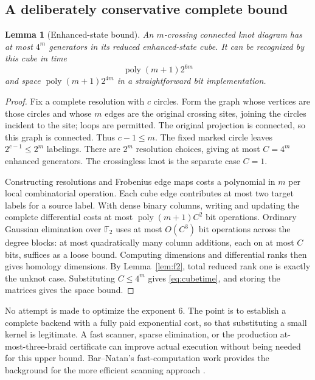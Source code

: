 \documentclass[11pt,letterpaper]{article}
\newtheorem{lemma}[theorem]{Lemma}
\theoremstyle{definition}
\newcommand{\F}{\mathbb F_2}
\newcommand{\poly}{\operatorname{poly}}
\begin{document}
\subsection{A deliberately conservative complete bound}
\begin{lemma}[Enhanced-state bound]
\label{lem:cubebound}
An $m$-crossing connected knot diagram has at most $4^m$ generators in its reduced enhanced-state cube. It can be recognized by this cube in time
\begin{equation}
 \poly(m+1)2^{6m}
 \label{eq:cubetime}
\end{equation}
and space $\poly(m+1)2^{4m}$ in a straightforward bit implementation.
\end{lemma}
\begin{proof}
Fix a complete resolution with $c$ circles. Form the graph whose vertices are those circles and whose $m$ edges are the original crossing sites, joining the circles incident to the site; loops are permitted. The original projection is connected, so this graph is connected. Thus $c-1\le m$. The fixed marked circle leaves $2^{c-1}\le2^m$ labelings. There are $2^m$ resolution choices, giving at most $C=4^m$ enhanced generators. The crossingless knot is the separate case $C=1$.

Constructing resolutions and Frobenius edge maps costs a polynomial in $m$ per local combinatorial operation. Each cube edge contributes at most two target labels for a source label. With dense binary columns, writing and updating the complete differential costs at most $\poly(m+1)C^2$ bit operations. Ordinary Gaussian elimination over $\F$ uses at most $O(C^3)$ bit operations across the degree blocks: at most quadratically many column additions, each on at most $C$ bits, suffices as a loose bound. Computing dimensions and differential ranks then gives homology dimensions. By Lemma~\ref{lem:f2}, total reduced rank one is exactly the unknot case. Substituting $C\le4^m$ gives \eqref{eq:cubetime}, and storing the matrices gives the space bound.
\end{proof}

No attempt is made to optimize the exponent $6$. The point is to establish a complete backend with a fully paid exponential cost, so that substituting a small kernel is legitimate. A fast scanner, sparse elimination, or the production at-most-three-braid certificate can improve actual execution without being needed for this upper bound. Bar--Natan's fast-computation work provides the background for the more efficient scanning approach \cite{barnatan}.
\end{document}
